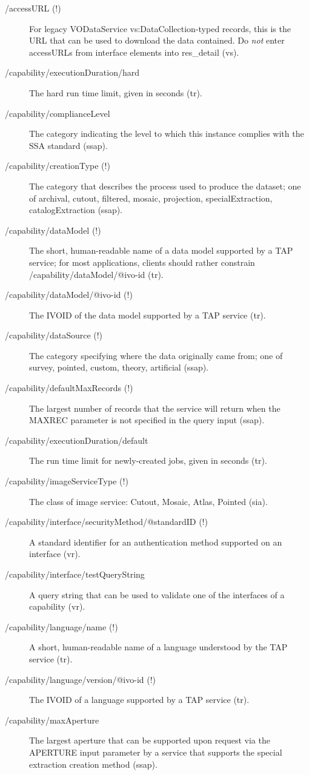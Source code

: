 \documentclass[11pt,a4paper]{ivoa}
\begin{document}
\begin{description}
\item[/accessURL (!)]For legacy VODataService vs:DataCollection-typed
records, this is
the URL that can be used to download the data contained.  Do
\emph{not} enter accessURLs from interface elements into res\_detail (vs).
\item[/capability/executionDuration/hard]The hard run time limit, given in seconds (tr).
\item[/capability/complianceLevel]The category indicating the level to which this instance complies with the SSA standard (ssap).
\item[/capability/creationType (!)]The category that describes the process used to produce the dataset; one of archival, cutout, filtered, mosaic, projection, specialExtraction, catalogExtraction (ssap).
\item[/capability/dataModel (!)]The short, human-readable name of a data model supported by a TAP service; for most applications, clients should rather constrain /capability/dataModel/@ivo-id (tr).
\item[/capability/dataModel/@ivo-id (!)]The IVOID of the data model supported by a TAP service (tr).
\item[/capability/dataSource (!)]The category specifying where the data originally came from; one of survey, pointed, custom, theory, artificial (ssap).
\item[/capability/defaultMaxRecords (!)]The largest number of records that the service will return when the MAXREC parameter is not specified in the query input (ssap).
\item[/capability/executionDuration/default]The run time limit for newly-created jobs, given in seconds (tr).
\item[/capability/imageServiceType (!)]The class of image service: Cutout, Mosaic, Atlas, Pointed (sia).
\item[/capability/inter\-face/securityMethod/@standardID (!)]A standard
identifier for an authentication method supported on an interface (vr).
\item[/capability/interface/testQueryString] A query string that can be
used to validate one of the interfaces of a capability (vr).
\item[/capability/language/name (!)]A short, human-readable name of a language understood by the TAP service (tr).
\item[/capability/language/version/@ivo-id (!)]The IVOID of a language supported by a TAP service (tr).
\item[/capability/maxAperture]The largest aperture that can be supported upon request via the APERTURE input parameter by a service that supports the special extraction creation method (ssap).

\end{description}
\end{document}
